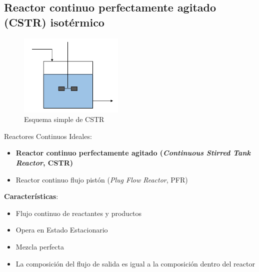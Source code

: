     \subsection{Reactor continuo perfectamente agitado (CSTR) isotérmico}
    
    \begin{minipage}{0.3\linewidth}
        \begin{figure}
            \centering
            \includegraphics[width=\textwidth]{img/diagramas/esquema_cstr.png}
            \caption{Esquema simple de CSTR}
            \label{fig:esquema_CSTR}
        \end{figure}
    \end{minipage}
    \begin{minipage}{0.6\linewidth}
        Reactores Continuos Ideales:
        
        \begin{itemize}
            \item \textbf{Reactor continuo perfectamente agitado (\textit{Continuous Stirred Tank Reactor}, CSTR)}
            \item Reactor continuo flujo pistón (\textit{Plug Flow Reactor}, PFR)
        \end{itemize}
    \end{minipage}
    
    \textbf{Características}:
    
    \begin{itemize}
        \item Flujo continuo de reactantes y productos
        \item Opera en Estado Estacionario
        \item Mezcla perfecta
        \item La composición del flujo de salida es igual a la composición dentro del reactor
    \end{itemize}
    
